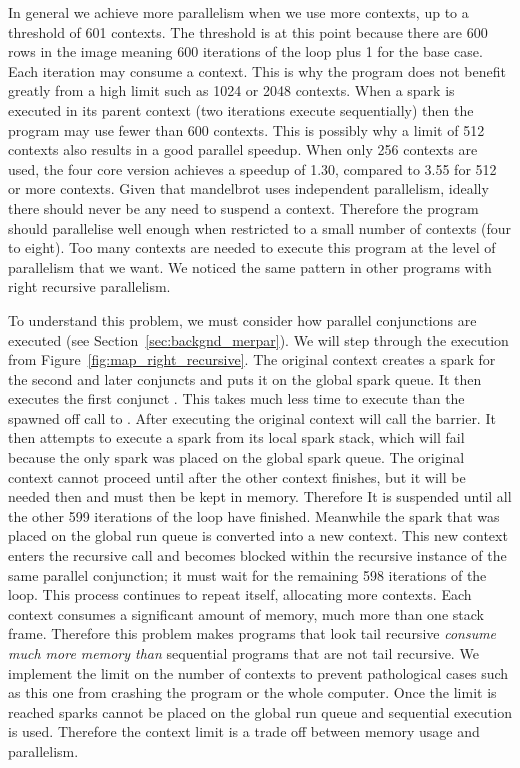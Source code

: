 In general we achieve more parallelism when we use more contexts,
up to a threshold of 601 contexts.
The threshold is at this point because
there are 600 rows in the image meaning 600 iterations of the loop plus 1
for the base case.
Each iteration may consume a context.
This is why the program does not benefit greatly from a high limit such as
1024 or 2048 contexts.
When a spark is executed in its parent context
(two iterations execute sequentially)
then the program may use fewer than 600 contexts.
This is possibly why a limit of 512 contexts also results in a good parallel
speedup.
When only 256 contexts are used,
the four core version achieves a speedup of 1.30,
compared to 3.55 for 512 or more contexts.
Given that mandelbrot uses independent parallelism,
ideally there should never be any need to suspend a context.
Therefore the program should parallelise well enough when restricted to
a small number of contexts (four to eight).
Too many contexts are needed to execute this program at the level of
parallelism that we want.
We noticed the same pattern in other programs with right recursive
parallelism.

\label{context_limit}
To understand this problem, we must consider how parallel conjunctions are
executed (see Section~\ref{sec:backgnd_merpar}).
We will step through the execution  from
Figure~\ref{fig:map_right_recursive}.
The original context creates a spark for the second and later conjuncts and
puts it on the global spark queue.
It then executes the first conjunct .
This takes much less time to execute than the spawned off call to
.
After executing  the original context will call the
\joinandcontinue barrier.
It then attempts to execute a spark from its local spark stack,
which will fail because the only spark was placed on the global spark queue.
The original context cannot proceed until after the other context finishes,
but it will be needed then and must then be kept in memory.
Therefore It is suspended until all the other 599 iterations of the loop
have finished.
Meanwhile the spark that was placed on the global run queue is converted
into a new context.
This new context enters the recursive call and
becomes blocked within the recursive instance of the same parallel
conjunction;
it must wait for the remaining 598 iterations of the loop.
This process continues to repeat itself,
allocating more contexts.
Each context consumes a significant amount of memory,
much more than one stack frame.
Therefore
this problem makes programs that look tail recursive
\emph{consume much more memory than}
sequential programs that are not tail recursive.
We implement the limit on the number of contexts to prevent pathological
cases such as this one from crashing the program or the whole computer.
Once the limit is reached sparks cannot be placed on the global run queue
and sequential execution is used.
Therefore the context limit is a trade off between memory usage and
parallelism.

